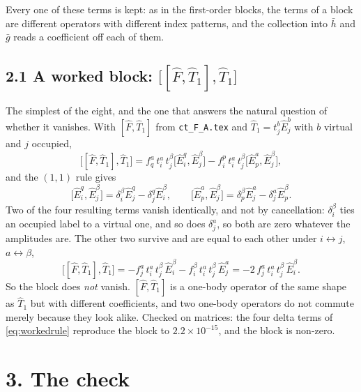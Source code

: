 \documentclass[11pt]{article}
\newcommand{\E}[2]{\hat E^{#1}_{#2}}
\newcommand{\occ}{i}
\newcommand{\vir}{a}
\begin{document}
\noindent
Every one of these terms is kept: as in the first-order blocks, the terms of a
block are different operators with different index patterns, and the collection
into $\bar h$ and $\bar g$ reads a coefficient off each of them.

\subsection*{2.1 A worked block: $\bigl[[\hat F,\hat T_1],\hat T_1\bigr]$}

The simplest of the eight, and the one that answers the natural question of
whether it vanishes. With $[\hat F,\hat T_1]$ from \texttt{ct\_F\_A.tex} and
$\hat T_1=t^b_j\E{b}{j}$ with $b$ virtual and $j$ occupied,
\begin{equation}
  \bigl[[\hat F,\hat T_1],\hat T_1\bigr]
   =f^\vir_q\,t^\vir_\occ\,t^\beta_j
      \bigl[\E{q}{\occ},\E{\beta}{j}\bigr]
    -f^p_\occ\,t^\vir_\occ\,t^\beta_j
      \bigl[\E{\vir}{p},\E{\beta}{j}\bigr],
  \label{eq:worked}
\end{equation}
and the $(1,1)$ rule gives
\begin{equation}
  \bigl[\E{q}{\occ},\E{\beta}{j}\bigr]
   =\delta^\beta_\occ\E{q}{j}-\delta^q_j\E{\beta}{\occ},
  \qquad
  \bigl[\E{\vir}{p},\E{\beta}{j}\bigr]
   =\delta^\beta_p\E{\vir}{j}-\delta^\vir_j\E{\beta}{p}.
  \label{eq:workedrule}
\end{equation}
Two of the four resulting terms vanish identically, and not by cancellation:
$\delta^\beta_\occ$ ties an occupied label to a virtual one, and so does
$\delta^\vir_j$, so both are zero whatever the amplitudes are. The other two
survive and are equal to each other under $\occ\leftrightarrow j$,
$\vir\leftrightarrow\beta$,
\begin{equation}
  \bigl[[\hat F,\hat T_1],\hat T_1\bigr]
   =-f^\vir_j\,t^\vir_\occ\,t^\beta_j\,\E{\beta}{\occ}
    -f^\beta_\occ\,t^\vir_\occ\,t^\beta_j\,\E{\vir}{j}
   =-2\,f^\vir_j\,t^\vir_\occ\,t^\beta_j\,\E{\beta}{\occ}.
  \label{eq:workedresult}
\end{equation}
So the block does \emph{not} vanish. $[\hat F,\hat T_1]$ is a one-body operator
of the same shape as $\hat T_1$ but with different coefficients, and two
one-body operators do not commute merely because they look alike. Checked on
matrices: the four delta terms of \eqref{eq:workedrule} reproduce the block to
$2.2\times10^{-15}$, and the block is non-zero.

\section*{3. The check}
\end{document}
